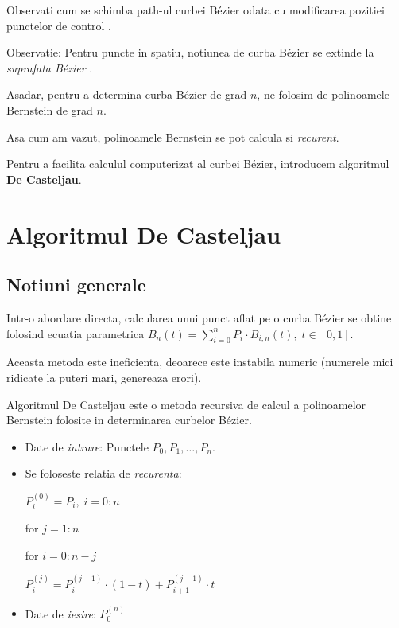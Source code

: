 \documentclass{article}
\begin{document}
Observati cum se schimba path-ul curbei B\'ezier odata cu modificarea pozitiei punctelor de control \framebox[0.4cm][r]{\footnotemark}.


Observatie: Pentru puncte in spatiu, notiunea de curba B\'ezier se extinde la \textit{suprafata B\'ezier} \framebox[0.4cm][r]{\footnotemark}.

Asadar, pentru a determina curba B\'ezier de grad $n$, ne folosim de polinoamele Bernstein de grad $n$.

Asa cum am vazut, polinoamele Bernstein se pot calcula si \textit{recurent}.

Pentru a facilita calculul computerizat al curbei B\'ezier, introducem algoritmul \textbf{De Casteljau}.

\section{Algoritmul De Casteljau}
\label{sec:casteljau}

\subsection{Notiuni generale}
\tab Intr-o abordare directa, calcularea unui punct aflat pe o curba B\'ezier se obtine folosind ecuatia parametrica $B_n(t) = \sum\limits_{i=0}^{n} P_i \cdot B_{i,n}(t),\; t \in [0, 1]$.

Aceasta metoda este ineficienta, deoarece este instabila numeric (numerele mici ridicate la puteri mari, genereaza erori).

Algoritmul De Casteljau este o metoda recursiva de calcul a polinoamelor Bernstein folosite in determinarea curbelor B\'ezier. \\

\begin{itemize}
    \item Date de \textit{intrare}: Punctele $P_0, P_1, \dots, P_n$.
    
    \item Se foloseste relatia de \textit{recurenta}:

        \tabto{1cm} $P_i^{(0)} = P_i,\; i = 0 : n$
        
        \tabto{1cm} for $j = 1 : n$
        
        \tabto{1.5cm} for $i = 0 : n-j$
        
        \tabto{2cm} $P_i^{(j)} = P_i^{(j-1)} \cdot (1-t) + P_{i+1}^{(j-1)} \cdot t$
        
    \item Date de \textit{iesire}: $P_0^{(n)}$
\end{itemize}
\end{document}
